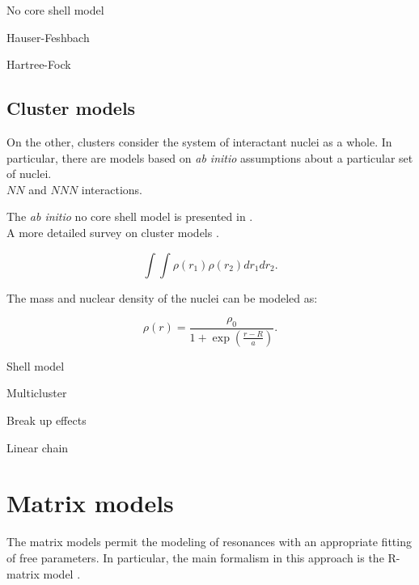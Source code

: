 \documentclass[openany]{book}
\begin{document}
No core shell model \cite{dohet-eraly_navratil_quaglioni_horiuchi_hupin_raimondi_2016}

Hauser-Feshbach \cite{jayatissa_avila_rehm_talwar_mohr_auranen_chen_gorelov_hoffman_jiang_et_2022}

Hartree-Fock \cite{leanh_minhloc_2022}


\subsection{Cluster models} \label{sub:microscopical_cluster}

On the other, clusters consider the system of interactant nuclei as a whole. In particular, there are models based on \textit{ab initio} assumptions about a particular set of nuclei.  \\

$NN$ and $NNN$ interactions.



The \textit{ab initio} no core shell model is presented in \cite{barrett_navratil_vary_2013}. \\

A more detailed survey on cluster models \cite{beck_2012}.

\begin{equation}  \label{eq:micro_folding}
	\int \int \rho(r_1) \rho(r_2) dr_1 dr_2. 
\end{equation}

The mass and nuclear density of the nuclei can be modeled as:

\begin{equation} \label{eq:micro_density}
	\rho(r) = \frac{\rho_0}{1 + \exp{\left(\frac{r - R}{a}\right)}}.
\end{equation} 


Shell model \cite{dong_wang_michel_ploszajczak_2022}
\cite{tazawa_1974}

Multicluster \cite{dufour_descouvemont_1997}
\cite{simenel_keser_umar_oberacker_2013}

Break up effects \cite{shubhchintak_descouvemont_2022}

Linear chain \cite{baba_taniguchi_kimura_2022}

\section{Matrix models}  \label{sec:matrixModels}

The matrix models permit the modeling of resonances with an appropriate fitting of free parameters. In particular, the main formalism in this approach is the R-matrix model \cite{lane_thomas_1958} \cite{descouvemont_baye_2010}. \\
\end{document}
